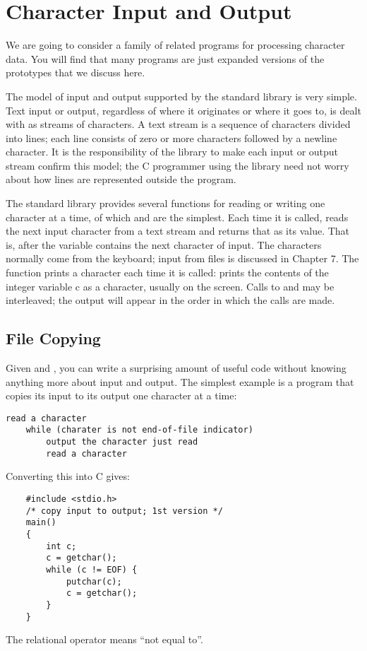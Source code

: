 \section{Character Input and Output}


We are going to consider a family of related programs for processing character data.
You will find that many programs are just expanded versions of the prototypes that we discuss here.

The model of input and output supported by the standard library is very simple.
Text input or output, regardless of where it originates or where it goes to, is dealt with as streams of characters.
A text stream is a sequence of characters divided into lines; each line consists of zero or more characters followed by a newline character.
It is the responsibility of the library to make each input or output stream confirm this model; the C programmer using the library need not worry about how lines are represented outside the program.

The standard library provides several functions for reading or writing one character at a time, of which  and  are the simplest.
Each time it is called,  reads the next input character from a text stream and returns that as its value.
That is, after  the variable  contains the next character of input.
The characters normally come from the keyboard; input from files is discussed in Chapter 7.
The function  prints a character each time it is called:  prints the contents of the integer variable c as a character, usually on the screen.
Calls to  and  may be interleaved; the output will appear in the order in which the calls are made.


\subsection{File Copying}

Given  and , you can write a surprising amount of useful code without knowing anything more about input and output.
The simplest example is a program that copies its input to its output one character at a time:
\begin{lstlisting}[basicstyle=\ttfamily\normalsize\itshape, keywordstyle=\color{black}]
	read a character
	while (charater is not end-of-file indicator)
		output the character just read
		read a character
\end{lstlisting}
Converting this into C gives:
\begin{lstlisting}
	#include <stdio.h>
	/* copy input to output; 1st version */
	main()
	{
		int c;
		c = getchar();
		while (c != EOF) {
			putchar(c);
			c = getchar();
		}
	}
\end{lstlisting}
The relational operator \code{!=} means ``not equal to''.

